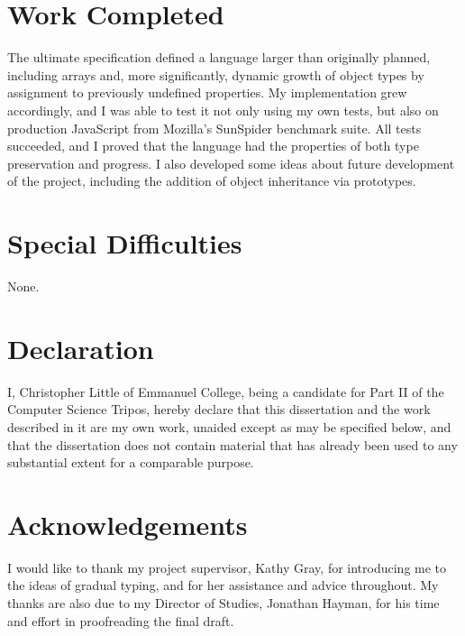\documentclass[12pt,a4paper,twoside,openright]{report}
\theoremstyle{definition}
\theoremstyle{dotless}
\begin{document}
\section*{Work Completed}

The ultimate specification defined a language larger than originally planned,
including arrays and, more significantly, dynamic growth of object types by
assignment to previously undefined properties. My implementation grew
accordingly, and I was able to test it not only using my own tests, but also on
production JavaScript from Mozilla's SunSpider benchmark suite. All tests
succeeded, and I proved that the language had the properties of both type
preservation and progress.  I also developed some ideas about future
development of the project, including the addition of object inheritance via
prototypes.


\section*{Special Difficulties}

None.

\newpage
\section*{Declaration}

I, Christopher Little of Emmanuel College, being a candidate for Part II of the
Computer Science Tripos, hereby declare that this dissertation and the work
described in it are my own work, unaided except as may be specified below, and
that the dissertation does not contain material that has already been used to
any substantial extent for a comparable purpose.

\bigskip
{}

\bigskip
\bigskip
{}

\tableofcontents

\listoffigures

\listoflistings

\newpage
\section*{Acknowledgements}

I would like to thank my project supervisor, Kathy Gray, for introducing
me to the ideas of gradual typing, and for her assistance and advice throughout.
My thanks are also due to my Director of Studies, Jonathan Hayman, for his time
and effort in proofreading the final draft.
\end{document}
